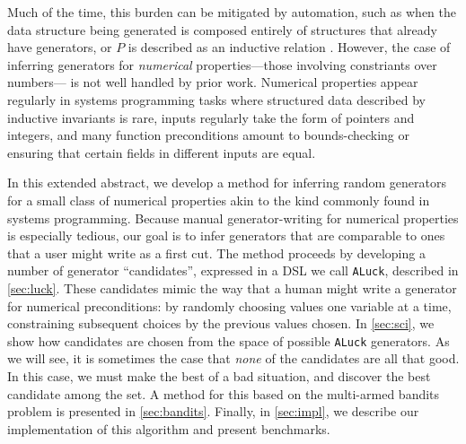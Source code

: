 \documentclass[sigconf,nonacm,review,anonymous]{acmart}
\begin{document}
Much of the time, this burden can be mitigated by automation, such as when the data structure being generated
is composed entirely of structures that already have generators, or $P$ is described as an inductive
relation \cite{gggir}. However, the case of inferring generators for \emph{numerical} properties---those involving constriants over numbers--- is not well
handled by prior work. Numerical properties appear regularly in
systems programming tasks \cite{ironfleet} where structured data described by inductive invariants is rare, inputs regularly
take the form of pointers and integers, and many function preconditions amount to bounds-checking or ensuring
that certain fields in different inputs are equal.

In this extended abstract, we develop a method for inferring random generators for a small class of numerical properties akin
to the kind commonly found in systems programming. Because manual generator-writing for numerical properties is especially
tedious, our goal is to infer generators that are comparable to ones that a user might write as a first cut.
The method proceeds by developing a number of generator ``candidates'', expressed in a DSL we call \texttt{ALuck}, described in \autoref{sec:luck}.
These candidates mimic the way that a human might write a generator for numerical preconditions: by randomly choosing values
one variable at a time, constraining subsequent choices by the previous values chosen. In \autoref{sec:sci}, we show how candidates
are chosen from the space of possible \texttt{ALuck} generators.
As we will see, it is sometimes the case that \emph{none} of the candidates are all that good. In this case, we must make the best
of a bad situation, and discover the best candidate among the set. A method for this based on the multi-armed bandits problem \cite{banditbook} is presented in \autoref{sec:bandits}.
Finally, in \autoref{sec:impl}, we describe our implementation of
this algorithm and present benchmarks.


\end{document}
